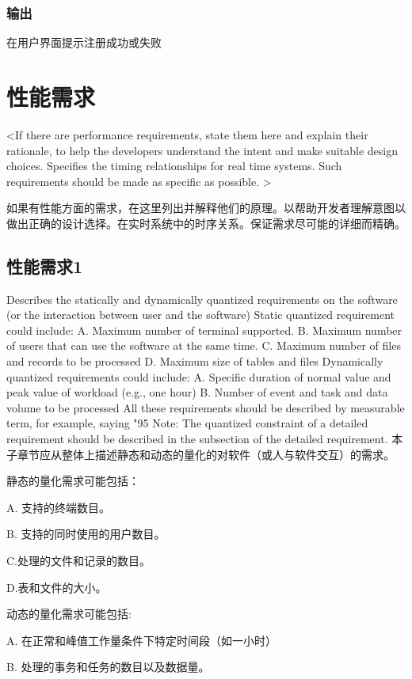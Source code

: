 \subsubsection{输出}
在用户界面提示注册成功或失败


\section{性能需求}
<If there are performance requirements, state them here and explain their rationale, to help the developers understand the intent and make suitable design choices. Specifies the timing relationships for real time systems. Such requirements should be made as specific as possible. >

如果有性能方面的需求，在这里列出并解释他们的原理。以帮助开发者理解意图以做出正确的设计选择。在实时系统中的时序关系。保证需求尽可能的详细而精确。
\subsection{性能需求1}
Describes the statically and dynamically quantized requirements on the software (or the interaction between user and the software)
Static quantized requirement could include:
A. Maximum number of terminal supported.
B. Maximum number of users that can use the software at the same time.
C. Maximum number of files and records to be processed
D. Maximum size of  tables and files
Dynamically quantized requirements could include:
A. Specific duration of normal value and peak value of workload (e.g., one hour)
B. Number of event and task and data volume to be processed 
All these requirements should be described by measurable term, for example, saying "95%
Note: The quantized constraint of a detailed requirement should be described in the subsection of the detailed requirement.
本子章节应从整体上描述静态和动态的量化的对软件（或人与软件交互）的需求。

静态的量化需求可能包括：

A. 支持的终端数目。

B. 支持的同时使用的用户数目。

C.处理的文件和记录的数目。

D.表和文件的大小。

动态的量化需求可能包括:

A. 在正常和峰值工作量条件下特定时间段（如一小时）

B. 处理的事务和任务的数目以及数据量。

